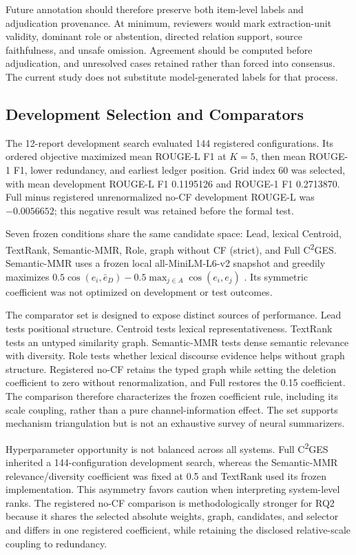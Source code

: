 \documentclass[applsci,article,submit,moreauthors]{Definitions/mdpi}
\newcommand{\cges}{C\textsuperscript{2}GES}
\begin{document}
Future annotation should therefore preserve both item-level labels and adjudication provenance. At minimum, reviewers would mark extraction-unit validity, dominant role or abstention, directed relation support, source faithfulness, and unsafe omission. Agreement should be computed before adjudication, and unresolved cases retained rather than forced into consensus. The current study does not substitute model-generated labels for that process.

\subsection{Development Selection and Comparators}

The 12-report development search evaluated 144 registered configurations. Its ordered objective maximized mean ROUGE-L F1 at $K=5$, then mean ROUGE-1 F1, lower redundancy, and earliest ledger position. Grid index 60 was selected, with mean development ROUGE-L F1 0.1195126 and ROUGE-1 F1 0.2713870. Full minus registered unrenormalized no-CF development ROUGE-L was $-0.0056652$; this negative result was retained before the formal test.

Seven frozen conditions share the same candidate space: Lead, lexical Centroid, TextRank, Semantic-MMR, Role, graph without CF (strict), and Full \cges{}. Semantic-MMR uses a frozen local all-MiniLM-L6-v2 snapshot and greedily maximizes $0.5\cos(e_i,\bar e_D)-0.5\max_{j\in A}\cos(e_i,e_j)$ \cite{reimers2019sentencebert}. Its symmetric coefficient was not optimized on development or test outcomes.

The comparator set is designed to expose distinct sources of performance. Lead tests positional structure. Centroid tests lexical representativeness. TextRank tests an untyped similarity graph. Semantic-MMR tests dense semantic relevance with diversity. Role tests whether lexical discourse evidence helps without graph structure. Registered no-CF retains the typed graph while setting the deletion coefficient to zero without renormalization, and Full restores the 0.15 coefficient. The comparison therefore characterizes the frozen coefficient rule, including its scale coupling, rather than a pure channel-information effect. The set supports mechanism triangulation but is not an exhaustive survey of neural summarizers.

Hyperparameter opportunity is not balanced across all systems. Full \cges{} inherited a 144-configuration development search, whereas the Semantic-MMR relevance/diversity coefficient was fixed at 0.5 and TextRank used its frozen implementation. This asymmetry favors caution when interpreting system-level ranks. The registered no-CF comparison is methodologically stronger for RQ2 because it shares the selected absolute weights, graph, candidates, and selector and differs in one registered coefficient, while retaining the disclosed relative-scale coupling to redundancy.
\end{document}
